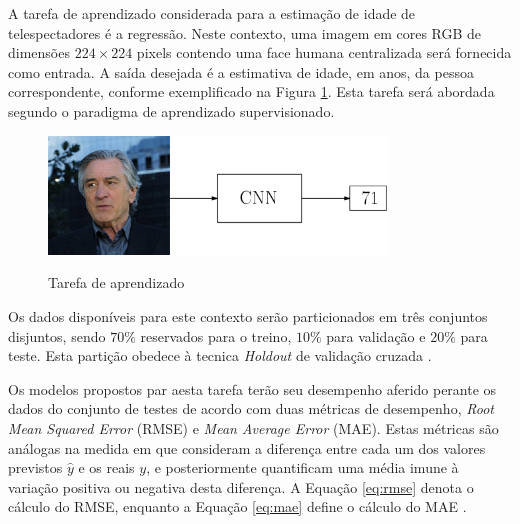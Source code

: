 A tarefa de aprendizado considerada para a estimação de idade de telespectadores é a regressão. Neste contexto, uma imagem em cores RGB de dimensões $224 \times 224$ pixels contendo uma face humana centralizada será fornecida como entrada. A saída desejada é a estimativa de idade, em anos, da pessoa correspondente, conforme exemplificado na Figura \ref{fig:deniro_cnn}. Esta tarefa será abordada segundo o paradigma de aprendizado supervisionado.

\begin{figure}[!ht]
  \centering
     \caption{Tarefa de aprendizado}
     \includegraphics[width=0.8\textwidth]{img/deniro_cnn}
     \label{fig:deniro_cnn}
\end{figure}

Os dados disponíveis para este contexto serão particionados em três conjuntos disjuntos, sendo $70\%$ reservados para o treino, $10\%$ para validação e $20\%$ para teste. Esta partição obedece à tecnica \emph{Holdout} de validação cruzada \cite{brink2016real}.


Os modelos propostos par aesta tarefa terão seu desempenho aferido perante os dados do conjunto de testes de acordo com duas métricas de desempenho, \emph{Root Mean Squared Error} (RMSE) e \emph{Mean Average Error} (MAE). Estas métricas são análogas na medida em que consideram a diferença entre cada um dos valores previstos $\hat{y}$ e os reais $y$, e posteriormente quantificam uma média imune à variação positiva ou negativa desta diferença. A Equação \ref{eq:rmse} denota o cálculo do RMSE, enquanto a Equação \ref{eq:mae} define o cálculo do MAE \cite{willmott2005advantages}.

